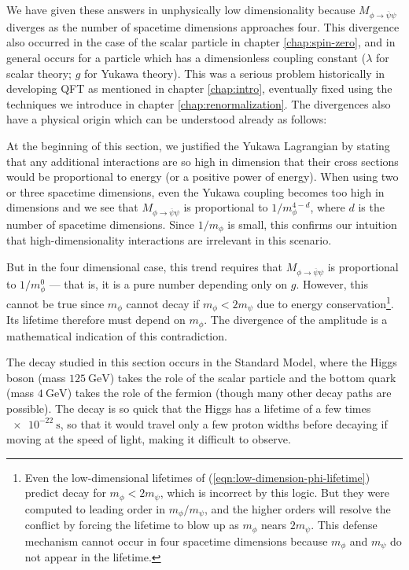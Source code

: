 We have given these answers in unphysically low dimensionality because $M_{\phi \rightarrow \overline \psi \psi}$ diverges as the number of spacetime dimensions approaches four. This divergence also occurred in the case of the scalar particle in chapter \ref{chap:spin-zero}, and in general occurs for a particle which has a dimensionless coupling constant ($\lambda$ for scalar theory; $g$ for Yukawa theory). This was a serious problem historically in developing QFT as mentioned in chapter \ref{chap:intro}, eventually fixed using the techniques we introduce in chapter \ref{chap:renormalization}. The divergences also have a physical origin which can be understood already as follows:

At the beginning of this section, we justified the Yukawa Lagrangian by stating that any additional interactions are so high in dimension that their cross sections would be proportional to energy (or a positive power of energy). When using two or three spacetime dimensions, even the Yukawa coupling becomes too high in dimensions and we see that $M_{\phi \rightarrow \overline \psi \psi}$ is proportional to $1/m_\phi^{4-d}$, where $d$ is the number of spacetime dimensions. Since $1/m_\phi$ is small, this confirms our intuition that high-dimensionality interactions are irrelevant in this scenario.

But in the four dimensional case, this trend requires that $M_{\phi \rightarrow \overline \psi \psi}$ is proportional to $1/m_\phi^0$ --- that is, it is a pure number depending only on $g$. However, this cannot be true since $m_\phi$ cannot decay if $m_\phi < 2m_\psi$ due to energy conservation\footnote{Even the low-dimensional lifetimes of (\ref{eqn:low-dimension-phi-lifetime}) predict decay for $m_\phi < 2m_\psi$, which is incorrect by this logic. But they were computed to leading order in $m_\phi/m_\psi$, and the higher orders will resolve the conflict by forcing the lifetime to blow up as $m_\phi$ nears $2m_\psi$. This defense mechanism cannot occur in four spacetime dimensions because $m_\phi$ and $m_\psi$ do not appear in the lifetime.}. Its lifetime therefore must depend on $m_\phi$. The divergence of the amplitude is a mathematical indication of this contradiction.

The decay studied in this section occurs in the Standard Model, where the Higgs boson (mass $\SI{125}{\giga \electronvolt}$) takes the role of the scalar particle and the bottom quark (mass $\SI{4}{\giga \electronvolt}$) takes the role of the fermion (though many other decay paths are possible). The decay is so quick that the Higgs has a lifetime of a few times $\SI{e-22}{\second}$, so that it would travel only a few proton widths before decaying if moving at the speed of light, making it difficult to observe.

